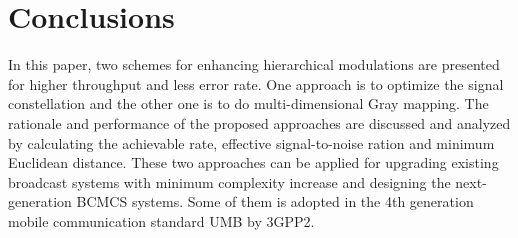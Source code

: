 \documentclass[10pt,fleqn, twocolumn]{IEEEtran}
\newcommand{\bs}{{\bf s}}
\begin{document}


\begin{figure}
\end{figure}



\section{Conclusions}
In this paper, two schemes for enhancing hierarchical modulations
are presented for higher throughput and less error rate. One
approach is to optimize the signal constellation and the other one
is to do multi-dimensional Gray mapping. The rationale and
performance of the proposed approaches are discussed and analyzed
by calculating the achievable rate, effective signal-to-noise
ration and minimum Euclidean distance. These two approaches can be
applied for upgrading existing broadcast systems with minimum
complexity increase and designing the next-generation BCMCS
systems. Some of them is adopted in the 4th generation mobile
communication standard UMB by 3GPP2.

\small


\end{document}
